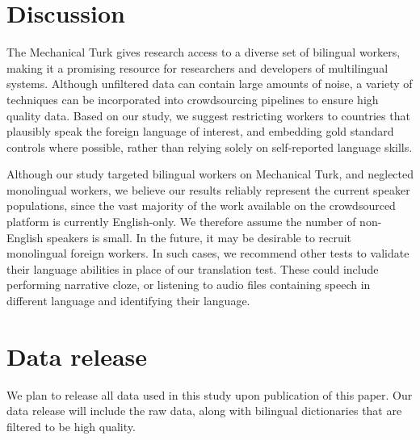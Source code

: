 \documentclass[11pt]{article}
\begin{document}
\section{Discussion}
The Mechanical Turk gives research access to a diverse set of bilingual workers, making it a promising resource for researchers and developers of multilingual systems. 
Although unfiltered data can contain large amounts of noise, 
a variety of techniques can be incorporated into crowdsourcing pipelines to ensure high quality data.  Based on our study, we suggest restricting workers to countries that plausibly speak the foreign language of interest, and embedding gold standard controls where possible, rather than relying solely on self-reported language skills.

Although our study targeted bilingual workers on Mechanical Turk, and neglected monolingual workers, we believe our results reliably represent the current speaker populations, since the vast majority of the work available on the crowdsourced platform is currently English-only.  We therefore assume the number of non-English speakers is small.  In the future, it may be desirable to recruit monolingual foreign workers.  In such cases, we recommend other tests to validate their language abilities in place of our translation test.  These could include performing narrative cloze, or listening to audio files containing speech in different language and identifying their language. 


\section{Data release}

We plan to release all data used in this study upon publication of this paper.  Our data release will include the raw data, along with bilingual dictionaries that are filtered to be high quality. 



\end{document}
